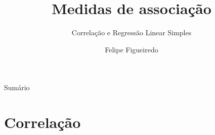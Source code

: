 \documentclass{beamer}
\title%
{Medidas de associação}
\subtitle
{Correlação e Regressão Linear Simples} %
\author%
{Felipe Figueiredo}%
\institute[INTO] %
{Instituto Nacional de Traumatologia e Ortopedia
}
\date%
{}
\begin{document}
\begin{frame}
  \titlepage
\end{frame}

\begin{frame}{Sumário}
  \tableofcontents
\end{frame}








\section{Correlação}
\end{document}
